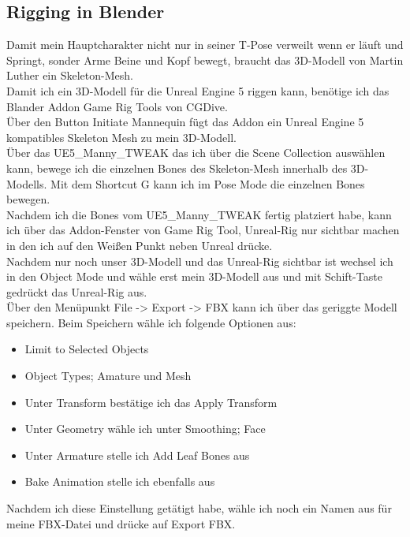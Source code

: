 \subsection{Rigging in Blender}%
Damit mein Hauptcharakter nicht nur in seiner T-Pose verweilt wenn er läuft und Springt, sonder Arme Beine und Kopf bewegt, braucht das 3D-Modell von Martin Luther ein Skeleton-Mesh.
\\
Damit ich ein 3D-Modell für die Unreal Engine 5 riggen kann, benötige ich das Blander Addon Game Rig Tools von CGDive.
\\
Über den Button Initiate Mannequin fügt das Addon ein Unreal Engine 5 kompatibles Skeleton Mesh zu mein 3D-Modell.
\\
Über das UE5\_Manny\_TWEAK das ich über die Scene Collection auswählen kann, bewege ich die einzelnen Bones des Skeleton-Mesh innerhalb des 3D-Modells. Mit dem Shortcut G kann ich im Pose Mode die einzelnen Bones bewegen.
\\
Nachdem ich die Bones vom UE5\_Manny\_TWEAK fertig platziert habe, kann ich über das Addon-Fenster von Game Rig Tool, Unreal-Rig nur sichtbar machen in den ich auf den Weißen Punkt neben Unreal drücke. 
\\
Nachdem nur noch unser 3D-Modell und das Unreal-Rig sichtbar ist wechsel ich in den Object Mode und wähle erst mein 3D-Modell aus und mit Schift-Taste gedrückt das Unreal-Rig aus.
\\
Über den Menüpunkt File -> Export -> FBX kann ich über das geriggte Modell speichern. Beim Speichern wähle ich folgende Optionen aus:
\begin{itemize}
	\item Limit to Selected Objects 
	\item Object Types; Amature und Mesh
	\item Unter Transform bestätige ich das Apply Transform
	\item Unter Geometry wähle ich unter Smoothing; Face
	\item Unter Armature stelle ich Add Leaf Bones aus
	\item Bake Animation stelle ich ebenfalls aus
\end{itemize}
Nachdem ich diese Einstellung getätigt habe, wähle ich noch ein Namen aus für meine FBX-Datei und drücke auf Export FBX.
